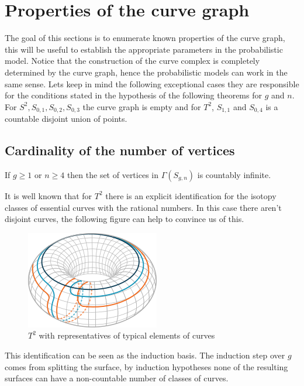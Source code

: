\section{Properties of the curve graph}
The goal of this sections is to enumerate known properties of the curve graph, this will be useful to establish the appropriate parameters in the probabilistic model. Notice that the construction of the curve complex is completely determined by the curve graph, hence the probabilistic models can work in the same sense. Lets keep in mind the following exceptional cases they are responsible for the conditions stated in the hypothesis of the following theorems for $g$ and $n$. For $ S^2, S_{0,1}, S _{0,2}, S_{0,3} $ the curve graph is empty and for  $ T^{2} $, $ S_{1,1}$ and $ S_{0,4}$ is a countable disjoint union of points.

\subsection{Cardinality of the number of vertices}
\begin{theorem}
If $g\geq 1$ or $n\geq 4$ then the set of vertices in $\Gamma(S_{g,n})$ is countably infinite.
\end{theorem}

It is well known that for $T^{2}$ there is an explicit identification for the isotopy classes of essential curves with the rational numbers. In this case there aren't disjoint curves, the following figure can help to convince us of this.
\vspace{1cm}
\begin{figure}[h!]
	\centering
	\includegraphics[scale=0.5]{Figures/Torus.png}
	\caption{$T^{2}$ with representatives of typical elements of curves}
\end{figure}

This identification can be seen as the induction basis. The induction step over $g$ comes from splitting the surface, by induction hypotheses none of the resulting surfaces can have a non-countable number of classes of curves.

